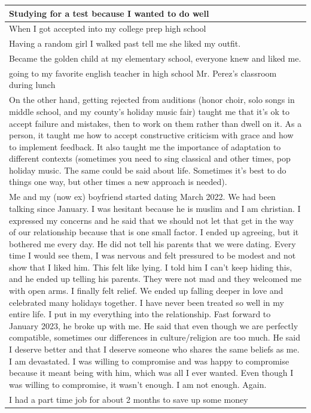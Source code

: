 \documentclass[
  .7em,
  letterpaper,
  DIV=11,
  numbers=noendperiod]{scrartcl}
\begin{document}
\begin{table}
\begin{tabular}{l}
\hline
Studying for a test because I wanted to do well\\
\hline
When I got accepted into my college prep high school\\
\hline
Having a random girl I walked past tell me she liked my outfit.\\
\hline
Became the golden child at my elementary school, everyone knew and liked me.\\
\hline
going to my favorite english teacher in high school Mr. Perez's classroom during lunch\\
\hline
On the other hand, getting rejected from auditions (honor choir, solo songs in middle school, and my county's holiday music fair) taught me that it's ok to accept failure and mistakes, then to work on them rather than dwell on it. As a person, it taught me how to accept constructive criticism with grace and how to implement feedback. It also taught me the importance of adaptation to different contexts (sometimes you need to sing classical and other times, pop holiday music. The same could be said about life. Sometimes it's best to do things one way, but other times a new approach is needed).\\
\hline
Me and my (now ex) boyfriend started dating March 2022. We had been talking since January. I was hesitant because he is muslim and I am christian. I expressed my concerns and he said that we should not let that get in the way of our relationship because that is one small factor. I ended up agreeing, but it bothered me every day. He did not tell his parents that we were dating. Every time I would see them, I was nervous and felt pressured to be modest and not show that I liked him. This felt like lying. I told him I can't keep hiding this, and he ended up telling his parents. They were not mad and they welcomed me with open arms. I finally felt relief. We ended up falling deeper in love and celebrated many holidays together. I have never been treated so well in my entire life. I put in my everything into the relationship. Fast forward to January 2023, he broke up with me. He said that even though we are perfectly compatible, sometimes our differences in culture/religion are too much. He said I deserve better and that I deserve someone who shares the same beliefs as me. I am devastated. I was willing to compromise and was happy to compromise because it meant being with him, which was all I ever wanted. Even though I was willing to compromise, it wasn't enough. I am not enough. Again.\\
\hline
I had a part time job for about 2 months to save up some money\\

\end{tabular}
\end{table}
\end{document}
